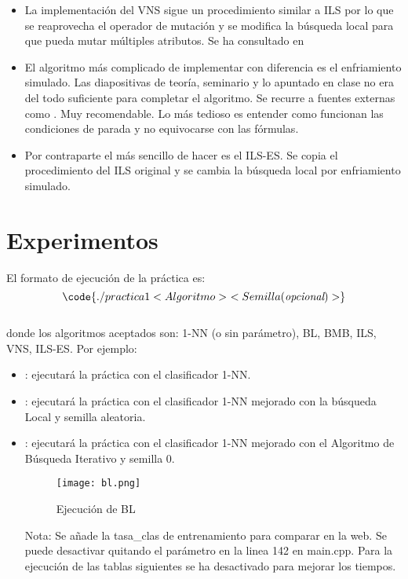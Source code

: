 \begin{itemize}
	\item La implementación del VNS sigue un procedimiento similar a ILS por lo que se reaprovecha el operador de mutación y se modifica la búsqueda local para que pueda mutar múltiples atributos. Se ha consultado en \cite{runl}
	
	\item El algoritmo más complicado de implementar con diferencia es el enfriamiento simulado. Las diapositivas de teoría, seminario y lo apuntado en clase no era del todo suficiente para completar el algoritmo. Se recurre a fuentes externas como \cite{greekforgeeks}. Muy recomendable. Lo más tedioso es entender como funcionan las condiciones de parada y no equivocarse con las fórmulas.
	
	\item Por contraparte el más sencillo de hacer es el ILS-ES. Se copia el procedimiento del ILS original y se cambia la búsqueda local por enfriamiento simulado.
\end{itemize}

\section{Experimentos}
El formato de ejecución de la práctica es:\\
$$\code{./practica1 <Algoritmo>  \  <Semilla(\textit{opcional})>}$$\\
donde los algoritmos aceptados son: 1-NN (o sin parámetro), BL, BMB, ILS, VNS, ILS-ES.
Por ejemplo:
\begin{itemize}
	\item {}: ejecutará la práctica con el clasificador 1-NN.
	\item {}: ejecutará la práctica con el clasificador 1-NN mejorado con la búsqueda Local y semilla aleatoria.
	\item {}: ejecutará la práctica con el clasificador 1-NN mejorado con el Algoritmo de Búsqueda Iterativo y semilla 0.
\begin{figure}[H]
	\centering
	\texttt{[image: bl.png]}
	\caption{Ejecución de BL}
	\label{fig:greedy}
\end{figure}
Nota: Se añade la tasa\_clas de entrenamiento para comparar en la web. Se puede desactivar quitando el parámetro  en la linea 142 en main.cpp. Para la ejecución de las tablas siguientes se ha desactivado para mejorar los tiempos. 
\end{itemize}


